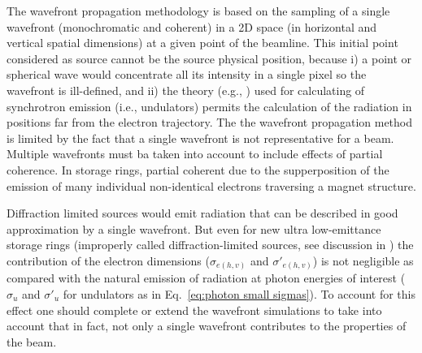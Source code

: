 \documentclass{iucr}              %
\newcommand{\inred}[1]{{\color{black}#1}}
\begin{document}
The wavefront propagation methodology is based on the sampling of a single wavefront (monochromatic and coherent) in a 2D space (in horizontal and vertical spatial dimensions) at a given point of the beamline. This initial point considered as source cannot be the source physical position, because i) a point or spherical wave would concentrate all its intensity in a single pixel so the wavefront is ill-defined, and ii) the theory (e.g., \cite{jackson}) used for calculating of  synchrotron emission (i.e., undulators) permits the calculation of the radiation in positions far from the electron trajectory. \inred{The the wavefront propagation method is limited by the fact that a single wavefront is not representative for a beam. Multiple wavefronts must ba taken into account to include effects of partial coherence. In storage rings, partial coherent due to the supperposition of the emission of many individual non-identical electrons traversing a magnet structure. }

Diffraction limited sources would emit radiation that can be described in good approximation by a single wavefront. But even for new ultra low-emittance storage rings (improperly called diffraction-limited sources, see discussion in \cite{arxivCF}) the contribution of the electron dimensions ($\sigma_{e(h,v)}$ and $\sigma'_{e(h,v)}$) is not negligible as compared with the natural emission of radiation \inred{at photon energies of interest} ($\sigma_u$ and $\sigma'_u$ for undulators as in Eq.~\ref{eq:photon small sigmas}). To account for this effect one should complete or extend the wavefront simulations to take into account that in fact, not only a single wavefront contributes to the properties of the beam. 
\end{document}
